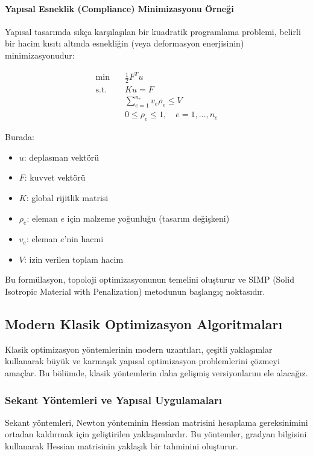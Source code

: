 \paragraph{Yapısal Esneklik (Compliance) Minimizasyonu Örneği}
Yapısal tasarımda sıkça karşılaşılan bir kuadratik programlama problemi, belirli bir hacim kısıtı altında esnekliğin (veya deformasyon enerjisinin) minimizasyonudur:

\begin{equation}
\begin{aligned}
\min & \quad \frac{1}{2}F^Tu \\
\text{s.t.} & \quad Ku = F \\
& \quad \sum_{e=1}^{n_e} v_e\rho_e \leq V \\
& \quad 0 \leq \rho_e \leq 1, \quad e = 1, \ldots, n_e
\end{aligned}
\end{equation}

Burada:
\begin{itemize}
    \item $u$: deplasman vektörü
    \item $F$: kuvvet vektörü
    \item $K$: global rijitlik matrisi
    \item $\rho_e$: eleman $e$ için malzeme yoğunluğu (tasarım değişkeni)
    \item $v_e$: eleman $e$'nin hacmi
    \item $V$: izin verilen toplam hacim
\end{itemize}

Bu formülasyon, topoloji optimizasyonunun temelini oluşturur ve SIMP (Solid Isotropic Material with Penalization) metodunun başlangıç noktasıdır.

\subsection{Modern Klasik Optimizasyon Algoritmaları}

Klasik optimizasyon yöntemlerinin modern uzantıları, çeşitli yaklaşımlar kullanarak büyük ve karmaşık yapısal optimizasyon problemlerini çözmeyi amaçlar. Bu bölümde, klasik yöntemlerin daha gelişmiş versiyonlarını ele alacağız.

\subsubsection{Sekant Yöntemleri ve Yapısal Uygulamaları}

Sekant yöntemleri, Newton yönteminin Hessian matrisini hesaplama gereksinimini ortadan kaldırmak için geliştirilen yaklaşımlardır. Bu yöntemler, gradyan bilgisini kullanarak Hessian matrisinin yaklaşık bir tahminini oluşturur.

